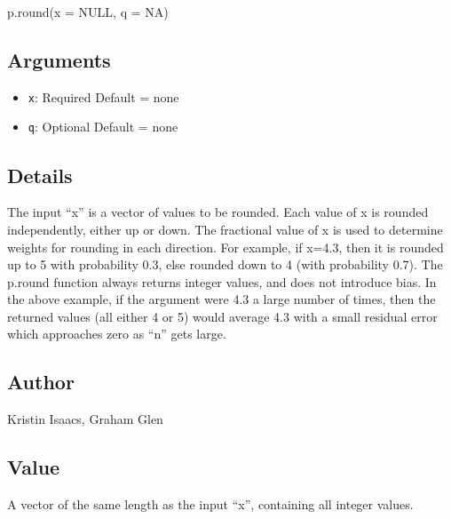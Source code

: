 \documentclass[
]{article}
\newenvironment{Shaded}{\begin{snugshade}}{\end{snugshade}}
\newcommand{\AttributeTok}[1]{\textcolor[rgb]{0.77,0.63,0.00}{#1}}
\newcommand{\ConstantTok}[1]{\textcolor[rgb]{0.00,0.00,0.00}{#1}}
\newcommand{\FunctionTok}[1]{\textcolor[rgb]{0.00,0.00,0.00}{#1}}
\newcommand{\NormalTok}[1]{#1}
\providecommand{\tightlist}{%
  \setlength{\itemsep}{0pt}\setlength{\parskip}{0pt}}
\begin{document}
\begin{Shaded}
\begin{Highlighting}[]
\FunctionTok{p.round}\NormalTok{(}\AttributeTok{x =} \ConstantTok{NULL}\NormalTok{, }\AttributeTok{q =} \ConstantTok{NA}\NormalTok{)}
\end{Highlighting}
\end{Shaded}

\hypertarget{arguments-27}{%
\subsection{Arguments}\label{arguments-27}}

\begin{itemize}
\tightlist
\item
  \texttt{x}: Required Default = none
\item
  \texttt{q}: Optional Default = none
\end{itemize}

\hypertarget{details-20}{%
\subsection{Details}\label{details-20}}

The input ``x'' is a vector of values to be rounded. Each value of x is
rounded independently, either up or down. The fractional value of x is
used to determine weights for rounding in each direction. For example,
if x=4.3, then it is rounded up to 5 with probability 0.3, else rounded
down to 4 (with probability 0.7). The p.round function always returns
integer values, and does not introduce bias. In the above example, if
the argument were 4.3 a large number of times, then the returned values
(all either 4 or 5) would average 4.3 with a small residual error which
approaches zero as ``n'' gets large.

\hypertarget{author-24}{%
\subsection{Author}\label{author-24}}

Kristin Isaacs, Graham Glen

\hypertarget{value-25}{%
\subsection{Value}\label{value-25}}

A vector of the same length as the input ``x'', containing all integer
values.
\end{document}
